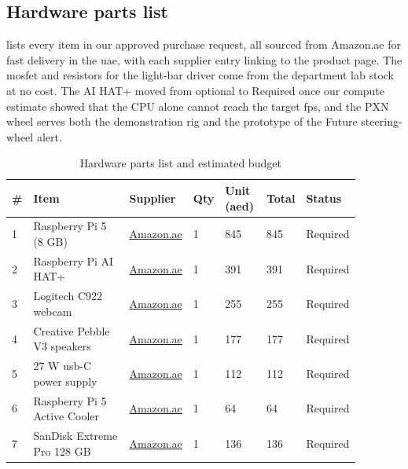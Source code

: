 \subsection{Hardware parts list}

 lists every item in our approved purchase request, all sourced from Amazon.ae for fast delivery in the \gls{uae}, with each supplier entry linking to the product page. The \gls{mosfet} and resistors for the light-bar driver come from the department lab stock at no cost. The AI HAT+ moved from optional to Required once our compute estimate showed that the CPU alone cannot reach the target \gls{fps}, and the PXN wheel serves both the demonstration rig and the prototype of the Future steering-wheel alert.

\begin{table}[htbp]
\centering
\caption{Hardware parts list and estimated budget}
\label{tab:ch5-09}
\footnotesize
\setlength{\tabcolsep}{3pt}
\renewcommand{\arraystretch}{1.15}
\begin{tabular}{|p{0.040\linewidth}|p{0.300\linewidth}|p{0.120\linewidth}|p{0.050\linewidth}|p{0.120\linewidth}|p{0.100\linewidth}|p{0.150\linewidth}|}
\hline
\textbf{\#} & \textbf{Item} & \textbf{Supplier} & \textbf{Qty} & \textbf{Unit (\gls{aed})} & \textbf{Total} & \textbf{Status} \\
\hline
1 & Raspberry Pi 5 (8 GB) & \href{https://www.amazon.ae/dp/B0CK2FCG1K}{\textcolor{own1}{Amazon.ae}} & 1 & 845 & 845 & Required \\ \hline
2 & Raspberry Pi AI HAT+ & \href{https://www.amazon.ae/dp/B0DKTTDW79}{\textcolor{own1}{Amazon.ae}} & 1 & 391 & 391 & Required \\ \hline
3 & Logitech C922 webcam & \href{https://www.amazon.ae/dp/B01MTTMPKT}{\textcolor{own1}{Amazon.ae}} & 1 & 255 & 255 & Required \\ \hline
4 & Creative Pebble V3 speakers & \href{https://www.amazon.ae/dp/B08F5BQZL8}{\textcolor{own1}{Amazon.ae}} & 1 & 177 & 177 & Required \\ \hline
5 & 27 W \gls{usb}-C power supply & \href{https://www.amazon.ae/dp/B0D4DM1D21}{\textcolor{own1}{Amazon.ae}} & 1 & 112 & 112 & Required \\ \hline
6 & Raspberry Pi 5 Active Cooler & \href{https://www.amazon.ae/dp/B0CW164TCW}{\textcolor{own1}{Amazon.ae}} & 1 & 64 & 64 & Required \\ \hline
7 & SanDisk Extreme Pro 128 GB & \href{https://www.amazon.ae/dp/B0DCW7MST8}{\textcolor{own1}{Amazon.ae}} & 1 & 136 & 136 & Required \\ \hline

\end{tabular}
\end{table}
